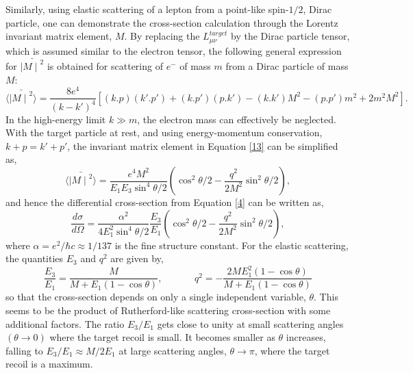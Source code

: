 Similarly, using elastic scattering of a lepton from a point-like spin-$1/2$, Dirac particle, one can demonstrate the cross-section calculation through the Lorentz invariant matrix element, $M$. By replacing the $L_{\mu \nu}^{target}$ by the Dirac particle tensor, which is assumed similar to the electron tensor, the following general expression for ${\bar { {\mid M \mid}^2}}$ is obtained for scattering of $e^-$ of mass $m$ from a Dirac particle of mass $M$:
\begin{equation}
\label{13}
\langle {\bar { {\mid M \mid}^2}} \rangle = \frac {8e^4}{(k-k')^4} [(k.p)(k'.p')+(k.p')(p.k')-(k.k')M^2-(p.p')m^2+2m^2M^2].
\end{equation}
In the high-energy limit $k \gg m$, the electron mass can effectively be neglected. With the target particle at rest, and using energy-momentum conservation, $k+p=k'+p'$, the invariant matrix element in Equation \eqref{13} can be simplified as,
\begin{equation}
\label{20}
\langle {\bar { {\mid M \mid}^2}} \rangle =\frac{e^4M^2}{E_1E_3\sin^4{\theta/2}}\left(\cos^2{\theta/2}-\frac{q^2}{2M^2}\sin^2 {\theta/2}\right),
\end{equation}
and hence the differential cross-section from Equation \eqref{4} can be written as,
 \begin{equation}
 \label{21}
  \frac{d\sigma}{d\Omega} = \frac {\alpha^2}{4E_1^2\sin^4 \theta/2} \frac{E_3}{E_1} \left(\cos^2 \theta/2 - \frac{q^2}{2M^2}\sin^2 {\theta/2}\right),
\end{equation}
where $\alpha = e^2/{\hbar c} \approx 1/137$ is the fine structure constant. For the elastic scattering, the quantities $E_3$ and $q^2$ are given by,
\begin{equation}
\label{22}
\frac {E_3}{E_1}=\frac {M}{M+E_1(1- \cos \theta)}, \,\,\,\,\,\,\,\,\,\,\,\,\,\,\,\,\,\,\,\,  q^2=-\frac{2ME_1^2(1-\cos\theta)}{M+E_1(1-\cos\theta)}
\end{equation}
so that the cross-section depends on only a single independent variable, $\theta$. This seems to be the product of Rutherford-like scattering cross-section with some additional factors. The ratio $E_3/E_1$ gets close to unity at small scattering angles $(\theta \rightarrow0)$ where the target recoil is small. It becomes smaller as $\theta$ increases, falling to $E_3/E_1 \approx M/2E_1$ at large scattering angles, $\theta \rightarrow \pi$, where the target recoil is a maximum.
 
